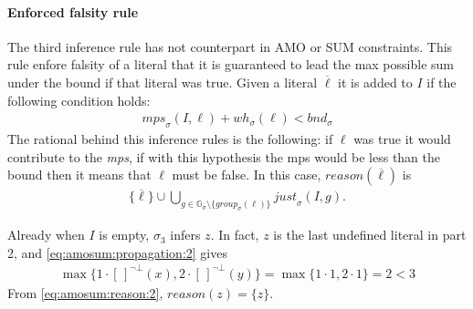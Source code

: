 \paragraph{Enforced falsity rule}
The third inference rule has not counterpart in AMO or SUM constraints.
This rule enfore falsity of a literal that it is guaranteed to lead the max possible 
sum under the bound if that literal was true.
Given a literal $\overline{\ell}$ it is added to $I$ if the following condition holds:
\begin{align}\label{eq:amosum:propagation:3}
    \mathit{mps}_{\sigma}(I,\ell) + \mathit{wh}_\sigma(\ell) < \mathit{bnd}_\sigma
\end{align}
The rational behind this inference rules is the following: if $\ell$ was true it would 
contribute to the \textit{mps}, if with this hypothesis the mps would be less than the bound then 
it means that $\ell$ must be false.
In this case, $\mathit{reason}(\overline{\ell})$ is
\begin{align}\label{eq:amosum:reason:3}
\{\overline{\ell}\} \cup \bigcup_{g \in \mathbb{G}_\sigma \setminus \{\mathit{group}_\sigma(\ell)\}}{
    \mathit{just}_\sigma(I,g)
}.
\end{align}

\begin{example}\label{ex:amosum:propagation:2}
    Already when $I$ is empty, $\sigma_3$ infers $z$.
    In fact, $z$ is the last undefined literal in part 2, and \eqref{eq:amosum:propagation:2} gives
    \begin{align*}
         \max\{1 \cdot [\,]^{\neg\bot}(x), 2 \cdot [\,]^{{\neg\bot}}(y)\} = \max\{1 \cdot 1, 2 \cdot 1\} = 2 < 3
    \end{align*}
From \eqref{eq:amosum:reason:2},
$\mathit{reason}(z) = \{z\}$.
\end{example}

